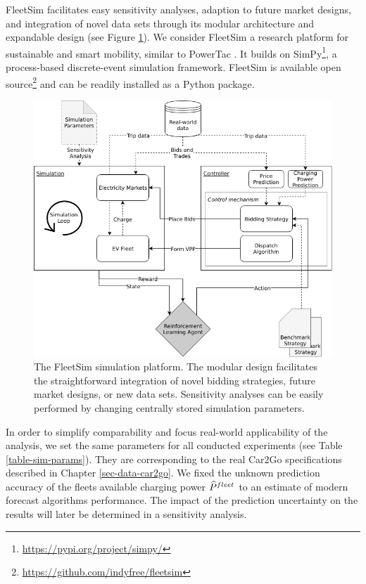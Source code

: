 \documentclass[a4paper, 12pt]{article}
\let\cite\shortcite
\begin{document}
FleetSim facilitates easy sensitivity analyses, adaption to future market
designs, and integration of novel data sets through its modular architecture and
expandable design (see Figure \ref{fig-fleetsim}). We consider FleetSim a research
platform for sustainable and smart mobility, similar to PowerTac
\cite{ketter16_multiagent_comp_gaming}. It builds on SimPy\footnote{\url{https://pypi.org/project/simpy/}}, a process-based
discrete-event simulation framework. FleetSim is available open source\footnote{\url{https://github.com/indyfree/fleetsim}} and
can be readily installed as a Python package.
\begin{figure}[hp]
\centering
\includegraphics[width=1\linewidth]{fig/simulation-platform.png}
\caption[The FleetSim Simulation Platform]{The FleetSim simulation platform. The modular design facilitates the straightforward integration of novel bidding strategies, future market designs, or new data sets. Sensitivity analyses can be easily performed by changing centrally stored simulation parameters. \label{fig-fleetsim}}
\end{figure}

In order to simplify comparability and focus real-world applicability of the
analysis, we set the same parameters for all conducted experiments (see Table
\ref{table-sim-params}). They are corresponding to the real Car2Go specifications
described in Chapter \ref{sec-data-car2go}. We fixed the unknown prediction
accuracy of the fleets available charging power \(\widehat{P}^{fleet}_{}\) to an estimate of
modern forecast algorithms performance. The impact of the prediction uncertainty
on the results will later be determined in a sensitivity analysis.
\end{document}
